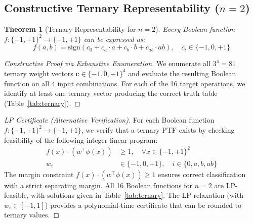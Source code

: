 \documentclass[Royal,times,sageh]{sagej}
\newcommand{\sign}{\text{sign}}
\newtheorem{theorem}{Theorem}
\begin{document}
\subsection{Constructive Ternary Representability ($n=2$)}

\begin{theorem}[Ternary Representability for $n=2$]
\label{thm:ternary}
Every Boolean function $f: \{-1, +1\}^2 \to \{-1, +1\}$ can be expressed as:
\begin{equation}
    f(a,b) = \sign(c_0 + c_a \cdot a + c_b \cdot b + c_{ab} \cdot ab), \quad c_i \in \{-1, 0, +1\}
\end{equation}
\end{theorem}

\begin{proof}[Constructive Proof via Exhaustive Enumeration]
We enumerate all $3^4 = 81$ ternary weight vectors $\mathbf{c} \in \{-1,0,+1\}^4$ and evaluate the resulting Boolean function on all 4 input combinations. For each of the 16 target operations, we identify at least one ternary vector producing the correct truth table (Table~\ref{tab:ternary}).
\end{proof}

\begin{proof}[LP Certificate (Alternative Verification)]
For each Boolean function $f: \{-1,+1\}^2 \to \{-1,+1\}$, we verify that a ternary PTF exists by checking feasibility of the following integer linear program:
\begin{align}
    f(x) \cdot (w^\top \phi(x)) &\geq 1, \quad \forall x \in \{-1,+1\}^2 \\
    w_i &\in \{-1, 0, +1\}, \quad i \in \{0, a, b, ab\}
\end{align}
The margin constraint $f(x) \cdot (w^\top \phi(x)) \geq 1$ ensures correct classification with a strict separating margin. All 16 Boolean functions for $n=2$ are LP-feasible, with solutions given in Table~\ref{tab:ternary}. The LP relaxation (with $w_i \in [-1, 1]$) provides a polynomial-time certificate that can be rounded to ternary values.
\end{proof}
\end{document}
